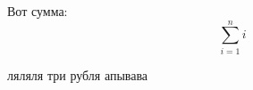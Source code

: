 \documentclass{article}
\begin{document}
Вот сумма:
\[
\sum_{i=1}^{n} i
\]

ляляля три рубля апывава
\end{document}

